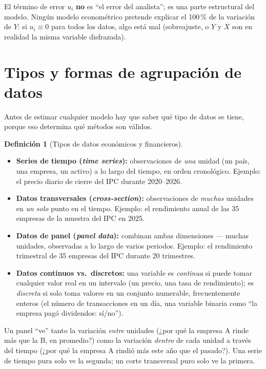 \documentclass[11pt,a4paper,oneside]{article}
\theoremstyle{definition}
\newtheorem{definition}{Definición}[section]
\begin{document}
\begin{warningBox}
El término de error $u_i$ \textbf{no} es ``el error del analista''; es una
parte estructural del modelo. Ningún modelo econométrico pretende explicar
el 100\,\% de la variación de $Y$: si $u_i\equiv0$ para todos los datos, algo
está mal (sobreajuste, o $Y$ y $X$ son en realidad la misma variable
disfrazada).
\end{warningBox}

\section{Tipos y formas de agrupación de datos}

Antes de estimar cualquier modelo hay que saber qué tipo de datos se tiene,
porque eso determina qué métodos son válidos.

\begin{definition}[Tipos de datos económicos y financieros]
\begin{itemize}[nosep]
\item \textbf{Series de tiempo (\emph{time series}):} observaciones de \emph{una}
unidad (un país, una empresa, un activo) a lo largo del tiempo, en orden
cronológico. Ejemplo: el precio diario de cierre del IPC durante 2020--2026.
\item \textbf{Datos transversales (\emph{cross-section}):} observaciones de
\emph{muchas} unidades en \emph{un solo} punto en el tiempo. Ejemplo: el
rendimiento anual de las 35 empresas de la muestra del IPC en 2025.
\item \textbf{Datos de panel (\emph{panel data}):} combinan ambas dimensiones ---
muchas unidades, observadas a lo largo de varios periodos. Ejemplo: el
rendimiento trimestral de 35 empresas del IPC durante 20 trimestres.
\item \textbf{Datos continuos vs.\ discretos:} una variable es \emph{continua}
si puede tomar cualquier valor real en un intervalo (un precio, una tasa de
rendimiento); es \emph{discreta} si solo toma valores en un conjunto
numerable, frecuentemente enteros (el número de transacciones en un día, una
variable binaria como ``la empresa pagó dividendos: sí/no'').
\end{itemize}
\end{definition}

\begin{summaryBox}
Un panel ``ve'' tanto la variación \emph{entre} unidades (¿por qué la
empresa A rinde más que la B, en promedio?) como la variación \emph{dentro}
de cada unidad a través del tiempo (¿por qué la empresa A rindió más este
año que el pasado?). Una serie de tiempo pura solo ve la segunda; un corte
transversal puro solo ve la primera.
\end{summaryBox}
\end{document}
